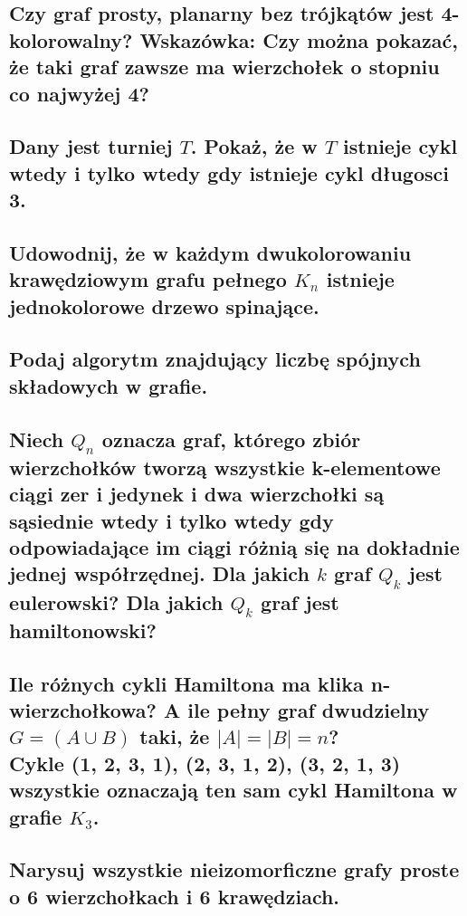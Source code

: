 \documentclass[12pt]{article}
\begin{document}
\subsection{Czy graf prosty, planarny bez trójkątów jest 4-kolorowalny? Wskazówka: Czy można pokazać, że taki graf zawsze ma wierzchołek o stopniu co najwyżej 4?}

\subsection{Dany jest turniej $T$. Pokaż, że w $T$ istnieje cykl wtedy i tylko wtedy gdy istnieje cykl długosci 3.}

\subsection{Udowodnij, że w każdym dwukolorowaniu krawędziowym grafu pełnego $K_n$ istnieje jednokolorowe drzewo spinające.}

\newpage

\subsection{Podaj algorytm znajdujący liczbę spójnych składowych w grafie.}

\subsection{Niech $Q_n$ oznacza graf, którego zbiór wierzchołków tworzą wszystkie k-elementowe ciągi zer i jedynek i dwa wierzchołki są sąsiednie wtedy i tylko wtedy gdy odpowiadające im ciągi różnią się na dokładnie jednej współrzędnej. Dla jakich $k$ graf $Q_k$ jest eulerowski? Dla jakich $Q_k$ graf jest hamiltonowski?}

\subsection{Ile różnych cykli Hamiltona ma klika n-wierzchołkowa? A ile pełny graf dwudzielny $G = (A \cup B)$ taki, że $|A| = |B| = n$? \\ Cykle (1, 2, 3, 1), (2, 3, 1, 2), (3, 2, 1, 3) wszystkie oznaczają ten sam cykl Hamiltona w grafie $K_3$.}

\subsection{Narysuj wszystkie nieizomorficzne grafy proste o 6 wierzchołkach i 6 krawędziach.}
\end{document}
